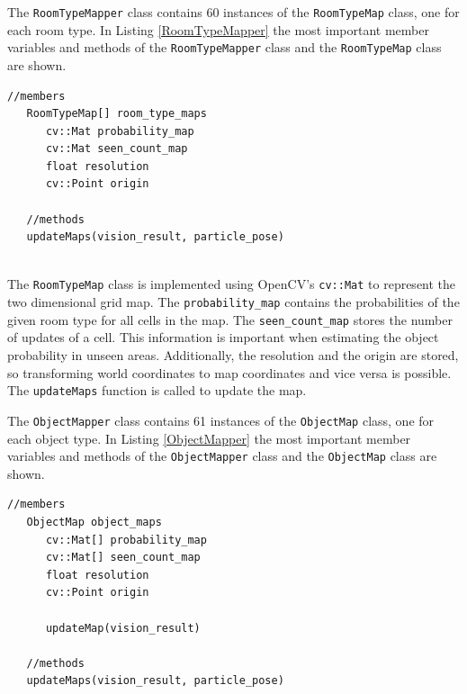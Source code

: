 The \texttt{RoomTypeMapper} class contains 60 instances of the \texttt{RoomTypeMap} class, one for each room type. In Listing \ref{RoomTypeMapper} the most important member variables and methods of the \texttt{RoomTypeMapper} class and the \texttt{RoomTypeMap} class are shown. 

\begin{minipage}{\linewidth}
\begin{lstlisting}[caption=\texttt{RoomTypeMapper} class and nested \texttt{RoomTypeMap} class,frame=single, label=RoomTypeMapper]
   //members
   RoomTypeMap[] room_type_maps
      cv::Mat probability_map
      cv::Mat seen_count_map
      float resolution
      cv::Point origin
   
   //methods
   updateMaps(vision_result, particle_pose)
   
\end{lstlisting}
\end{minipage} 

The \texttt{RoomTypeMap} class is implemented using OpenCV's \texttt{cv::Mat} to represent the two dimensional grid map. The \texttt{probability{\_}map} contains the probabilities of the given room type for all cells in the map. The \texttt{seen{\_}count{\_}map} stores the number of updates of a cell. This information is important when estimating the object probability in unseen areas. Additionally, the resolution and the origin are stored, so transforming world coordinates to map coordinates and vice versa is possible. The \texttt{updateMaps} function is called to update the map.


The \texttt{ObjectMapper} class contains 61 instances of the \texttt{ObjectMap} class, one for each object type. In Listing \ref{ObjectMapper} the most important member variables and methods of the \texttt{ObjectMapper} class and the \texttt{ObjectMap} class are shown. 

\begin{minipage}{\linewidth}
\begin{lstlisting}[caption=\texttt{ObjectMapper} class and nested \texttt{ObjectMap} class,frame=single, label=ObjectMapper]
   //members
   ObjectMap object_maps
      cv::Mat[] probability_map
      cv::Mat[] seen_count_map  
      float resolution
      cv::Point origin
      
      updateMap(vision_result)
      
   //methods
   updateMaps(vision_result, particle_pose)
   
\end{lstlisting}
\end{minipage} 

